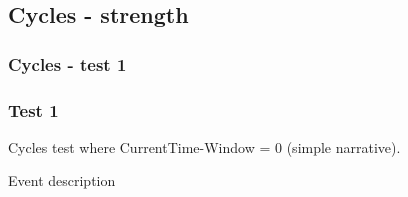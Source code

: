 \documentclass[8pt]{beamer}
\begin{document}
\subsection{Cycles - strength}
\begin{frame}
    \frametitle{Cycles - test 1}
    \subsubsection{Test 1}
    \small
    Cycles test where CurrentTime-Window = 0 (simple narrative).\linebreak
    \begin{minipage}{0.4\linewidth}
        \begin{table}[t!]
            \caption{Event description}
            \begin{center}


\end{center}
\end{table}
\end{minipage}
\end{frame}
\end{document}

